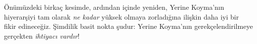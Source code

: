 Önümüzdeki birkaç kesimde, ardından
 içinde yeniden, Yerine Koyma'nın
hiyerarşiyi tam olarak \emph{ne kadar} yüksek olmaya zorladığına ilişkin daha
iyi bir fikir edineceğiz. Şimdilik basit nokta şudur: Yerine Koyma'nın
gerekçelendirilmeye gerçekten \emph{ihtiyacı vardır}!

